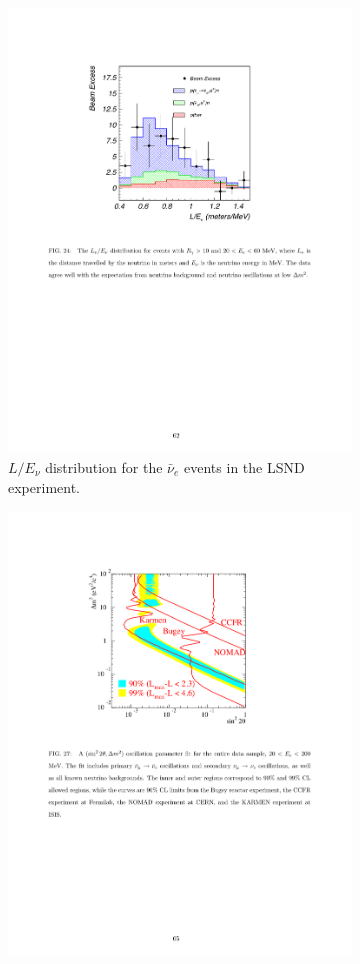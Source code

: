 \begin{figure}[htbp]
  \begin{subfigure}{0.45\textwidth}
    \includegraphics[height=\linewidth]{figures/lsndresult.pdf}
    \caption{$L/E_{\nu}$ distribution for the $\bar{\nu}_{e}$ events in the LSND experiment.}\label{fig:resultlsnd}
  \end{subfigure}\hfill
  \begin{subfigure}{0.45\textwidth}
    \begin{center}
        \includegraphics[height=\linewidth]{figures/lsnd_space.pdf}

\end{center}
\end{subfigure}
\end{figure}
